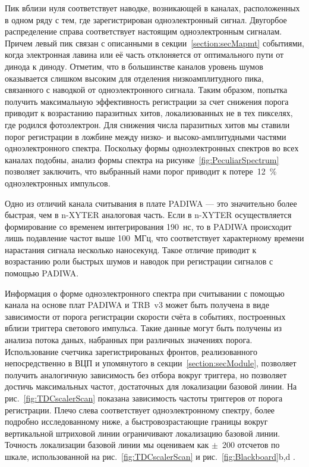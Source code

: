 Пик вблизи нуля соответствует наводке, возникающей в каналах, расположенных в одном ряду с тем, где зарегистрирован одноэлектронный сигнал. Двугорбое распределение справа соответствует настоящим одноэлектронным сигналам. Причем левый пик связан с описанными в секции~\ref{section:secMapmt} событиями, когда электронная лавина или её часть отклоняется от оптимального пути от динода к диноду. Отметим, что в большинстве каналов уровень шумов оказывается слишком высоким для отделения низкоамплитудного пика, связанного с наводкой от одноэлектронного сигнала. Таким образом, попытка получить максимальную эффективность регистрации за счет снижения порога приводит к возрастанию паразитных хитов, локализованных не в тех пикселях, где родился фотоэлектрон. Для снижения числа паразитных хитов мы ставили порог регистрации в ложбине между низко- и высоко-амплитудными частями одноэлектронного спектра. Поскольку формы одноэлектронных спектров во всех каналах подобны, анализ формы спектра на рисунке~\ref{fig:PeculiarSpectrum} позволяет заключить, что выбранный нами порог приводит к потере~12~\% одноэлектронных импульсов.

Одно из отличий канала считывания в плате PADIWA --- это значительно более быстрая, чем в n-XYTER аналоговая часть. Если в n-XYTER осуществляется формирование со временем интегрирования 190~нс, то в PADIWA происходит лишь подавление частот выше 100~МГц, что соответствует характерному времени нарастания сигнала несколько наносекунд. Такое отличие приводит к возрастанию роли быстрых шумов и наводок при регистрации сигналов с помощью PADIWA.

Информация о форме одноэлектронного спектра при считывании с помощью канала на основе плат PADIWA и TRB~v3 может быть получена в виде зависимости от порога регистрации скорости счёта в событиях, построенных вблизи триггера светового импульса. Такие данные могут быть получены из анализа потока даных, набранных при различных значениях порога. Использование счетчика зарегистрированых фронтов, реализованного непосредственно в ВЦП и упомянутого в секции~\ref{section:secModule}, позволяет получить аналогичную зависимость без отбора вокруг триггера, но позволяет достичь максимальных частот, достаточных для локализации базовой линии. На рис.~\ref{fig:TDCscalerScan} показана зависимость частоты триггеров от порога регистрации. Плечо слева соответствует одноэлектронному спектру, более подробно исследованному ниже, а быстровозрастающие границы вокруг вертикальной штриховой линии ограничивают локализацию базовой линии. Точность локализации базовой линии мы оцениваем как $ \pm $~200 отсчетов по шкале, использованной на рис.~\ref{fig:TDCscalerScan} и рис.~\ref{fig:Blackboard}b,d .


